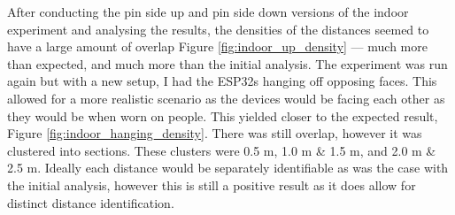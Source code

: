 \documentclass{l4proj}
\begin{document}
After conducting the pin side up and pin side down versions of the indoor experiment and analysing the results, the densities of the distances seemed to have a large amount of overlap Figure \ref{fig:indoor_up_density} — much more than expected, and much more than the initial analysis. The experiment was run again but with a new setup, I had the ESP32s hanging off opposing faces. This allowed for a more realistic scenario as the devices would be facing each other as they would be when worn on people. This yielded closer to the expected result, Figure \ref{fig:indoor_hanging_density}. There was still overlap, however it was clustered into sections. These clusters were 0.5 m, 1.0 m \& 1.5 m, and 2.0 m \& 2.5 m. Ideally each distance would be separately identifiable as was the case with the initial analysis, however this is still a positive result as it does allow for distinct distance identification.
\end{document}
